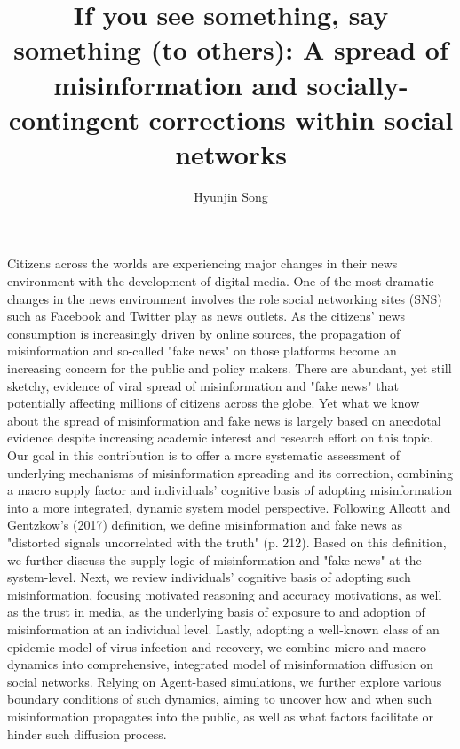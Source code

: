 \documentclass[man, 12pt, a4paper]{apa6}
\title{If you see something, say something (to others): A spread of misinformation and socially-contingent corrections within social networks}
\author{Hyunjin Song}
\affiliation{Department of Communication, University of Vienna, Austria}
\begin{document}
\maketitle
Citizens across the worlds are experiencing major changes in their news environment with the development of digital media. One of the most dramatic changes in the news environment involves the role social networking sites (SNS) such as Facebook and Twitter play as news outlets. As the citizens' news consumption is increasingly driven by online sources, the propagation of misinformation and so-called "fake news" on those platforms become an increasing concern for the public and policy makers. There are abundant, yet still sketchy, evidence of viral spread of misinformation and "fake news" that potentially affecting millions of citizens across the globe. Yet what we know about the spread of misinformation and fake news is largely based on anecdotal evidence despite increasing academic interest and research effort on this topic. Our goal in this contribution is to offer a more systematic assessment of underlying mechanisms of misinformation spreading and its correction, combining a macro supply factor and individuals' cognitive basis of adopting misinformation into a more integrated, dynamic system model perspective. Following Allcott and Gentzkow's (2017) definition, we define misinformation and fake news as "distorted signals uncorrelated with the truth" (p. 212). Based on this definition, we further discuss the supply logic of misinformation and "fake news" at the system-level. Next, we review individuals' cognitive basis of adopting such misinformation, focusing motivated reasoning and accuracy motivations, as well as the trust in media, as the underlying basis of exposure to and adoption of misinformation at an individual level. Lastly, adopting a well-known class of an epidemic model of virus infection and recovery, we combine micro and macro dynamics into comprehensive, integrated model of misinformation diffusion on social networks. Relying on Agent-based simulations, we further explore various boundary conditions of such dynamics, aiming to uncover how and when such misinformation propagates into the public, as well as what factors facilitate or hinder such diffusion process.
\end{document}
